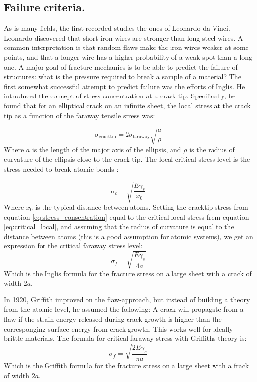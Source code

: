 \subsection{Failure criteria.}
As is many fields, the first recorded studies the ones of Leonardo da Vinci. Leonardo discovered that short iron wires are stronger than long steel wires. A common interpretation is that random flaws make the iron wires weaker at some points, and that a longer wire has a higher probability of a weak spot than a long one. A major goal of fracture mechanics is to be able to predict the failure of structures: what is the pressure required to break a sample of a material? The first somewhat successful attempt to predict failure was the efforts of Inglis. He introduced the concept of stress concentration at a crack tip. Specifically, he found that for an elliptical crack on an infinite sheet, the local stress at the crack tip as a function of the faraway tensile stress was:

\begin{equation}
	\sigma_{\text{cracktip}} = 2\sigma_{\text{faraway}}\sqrt{\frac{a}{\rho}}
	\label{eq:stress_consentration}
\end{equation}
Where $a$ is the length of the major axis of the ellipsis, and $\rho$ is the radius of curvature of the ellipsis close to the crack tip. The local critical stress level is the stress needed to break atomic bonds \cite[p. 27]{Anderson2005}:

\begin{equation}
	\sigma_c = \sqrt{\frac{E\gamma_s}{x_0}}
	\label{eq:critical_local}
\end{equation}
Where $x_0$ is the typical distance between atoms. Setting the cracktip stress from equation \ref{eq:stress_consentration} equal to the critical local stress from equation \ref{eq:critical_local}, and assuming that the radius of curvature is equal to the distance between atoms (this is a good assumption for atomic systems), we get an expression for the critical faraway stress level:
\begin{equation}
	\sigma_f = \sqrt{\frac{E\gamma_s}{4a}}
	\label{eq:inglis_formula}
\end{equation}
Which is the Inglis formula for the fracture stress on a large sheet with a crack of width $2a$.

In 1920, Griffith improved on the flaw-approach, but instead of building a theory from the atomic level, he assumed the following: A crack will propagate from a flaw if the strain energy released during crack growth is higher than the corresponging surface energy from crack growth. This works well for ideally brittle materials. The formula for critical faraway stress with Griffiths theory is:
\begin{equation}
	\sigma_f = \sqrt{\frac{2E\gamma_s}{\pi a}}
\end{equation}
Which is the Griffith formula for the fracture stress on a large sheet with a frack of width $2a$. 

